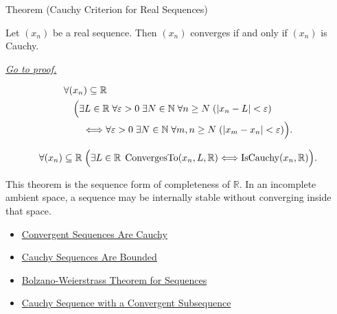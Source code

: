 
\begin{theorembox}{Theorem (Cauchy Criterion for Real Sequences)}
\begin{theorem}
\label{thm:cauchy-criterion-real-sequences}
Let $(x_n)$ be a real sequence. Then $(x_n)$ converges if and only if
$(x_n)$ is Cauchy.

\smallskip
\noindent
\hyperref[prf:cauchy-criterion-real-sequences]{\textit{Go to proof.}}
\end{theorem}
\end{theorembox}

\begin{remark*}
\[
\begin{aligned}
&\forall (x_n)\subseteq\mathbb{R}\\
&\quad
\Bigl(
  \exists L\in\mathbb{R}\;\forall \varepsilon>0\;\exists N\in\mathbb{N}
  \;\forall n\ge N\;( |x_n-L|<\varepsilon )\\
&\qquad\Longleftrightarrow
  \forall \varepsilon>0\;\exists N\in\mathbb{N}\;\forall m,n\ge N
  \;( |x_m-x_n|<\varepsilon )
\Bigr).
\end{aligned}
\]
\end{remark*}

\begin{remark*}
\[
\forall (x_n)\subseteq\mathbb{R}\;
\Bigl(
  \exists L\in\mathbb{R}\;\operatorname{ConvergesTo}(x_n,L,\mathbb{R})
  \Longleftrightarrow
  \operatorname{IsCauchy}(x_n,\mathbb{R})
\Bigr).
\]
\end{remark*}

\begin{remark*}[Interpretation]
This theorem is the sequence form of completeness of $\mathbb{R}$. In an
incomplete ambient space, a sequence may be internally stable without
converging inside that space.
\end{remark*}

\begin{dependencies}
\begin{itemize}
  \item \hyperref[thm:convergent-sequences-are-cauchy]{Convergent Sequences Are Cauchy}
  \item \hyperref[thm:cauchy-sequences-are-bounded]{Cauchy Sequences Are Bounded}
  \item \hyperref[thm:bolzano-weierstrass-sequences]{Bolzano-Weierstrass Theorem for Sequences}
  \item \hyperref[thm:cauchy-convergent-subsequence-converges]{Cauchy Sequence with a Convergent Subsequence}
\end{itemize}
\end{dependencies}

